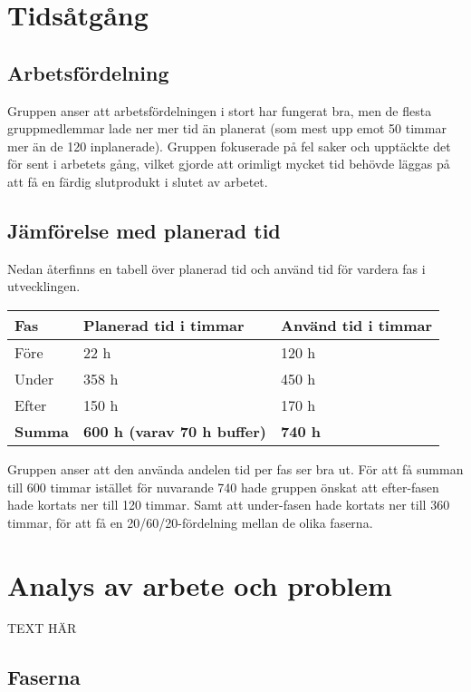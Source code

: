 \documentclass[10pt,oneside,swedish]{lips}
\begin{document}
\cleardoublepage
{}\cfoot{\thepage}

\section{Tidsåtgång}
\subsection{Arbetsfördelning}

Gruppen anser att arbetsfördelningen i stort har fungerat bra, men de flesta
gruppmedlemmar lade ner mer tid än planerat (som mest upp emot 50 timmar mer än
de 120 inplanerade). Gruppen fokuserade på fel saker och upptäckte det för sent i
arbetets gång, vilket gjorde att orimligt mycket tid behövde läggas på att få en
färdig slutprodukt i slutet av arbetet. 

\subsection{Jämförelse med planerad tid}

Nedan återfinns en tabell över planerad tid och använd tid för vardera fas i
utvecklingen. 

\begin{tabular}{|l|l|l|} \hline
	\textbf{Fas} & \textbf{Planerad tid i timmar} & \textbf{Använd tid i timmar} \\\hline
	Före & 22 h & 120 h \\\hline
	Under & 358 h & 450 h \\\hline
	Efter & 150 h & 170 h \\\hline
	\textbf{Summa} & \textbf{600 h (varav 70 h buffer)} & \textbf{740 h} \\\hline
\end{tabular}

Gruppen anser att den använda andelen tid per fas ser bra ut. För att få summan
till 600 timmar istället för nuvarande 740 hade gruppen önskat att efter-fasen
hade kortats ner till 120 timmar. Samt att under-fasen hade kortats ner till 360
timmar, för att få en 20/60/20-fördelning mellan de olika faserna.

\section{Analys av arbete och problem}

TEXT HÄR

\subsection{Faserna}
\end{document}
